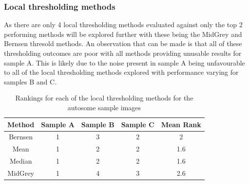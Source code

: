 \subsubsection{Local thresholding methods}
As there are only 4 local thresholding methods evaluated against only the top 2 performing methods will be explored further with these being the MidGrey and Bernsen thresold methods. An observation that can be made is that all of these thresholding outcomes are poor with all methods providing unusable results for sample A. This is likely due to the noise present in sample A being unfavourable to all of the local thresholding methods explored with performance varying for samples B and C.
\begin{table}[hb!]
	\centering
	\begin{tabular}{|c|c|c|c|c|}
		\hline
		\textbf{Method} & \textbf{Sample A} & \textbf{Sample B} & \textbf{Sample C} & \textbf{Mean Rank} \\
		\hline
		Bernsen & 1 & 3 & 2 & 2 \\
		\hline
		Mean & 1 & 2 & 2 & 1.6 \\
		\hline
		Median & 1 & 2 & 2 & 1.6 \\
		\hline
		MidGrey & 1 & 4 & 3 & 2.6 \\
		\hline
	\end{tabular}
	\caption{Rankings for each of the local thresholding methods for the autosome sample images}
	\label{tab:auto_local_ranks}
\end{table}
\FloatBarrier

